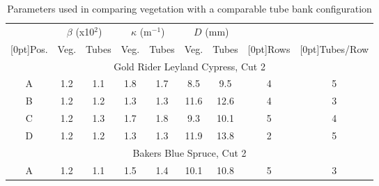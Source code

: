 \documentclass[12pt]{article}
\begin{document}
\begin{table}[!]
    \centering
    \caption{Parameters used in comparing vegetation with a comparable tube bank configuration}
    \label{tab:tube_parameters}
    \begin{tabular}{|c|c|c|c|c|c|c|c|c|}
    \hline
                                 & \multicolumn{2}{|c|}{$\beta$ (x10$^{2}$)} & \multicolumn{2}{|c|}{$\kappa$ (m$^{-1}$)} & \multicolumn{2}{|c|}{$D$ (mm)} &                             &                                  \\ \cline{2-7}
    \raisebox{1.5ex}[0pt]{Pos.}  & Veg.             & Tubes      & Veg.                 & Tubes              & Veg.              & Tubes      & \raisebox{1.5ex}[0pt]{Rows} & \raisebox{1.5ex}[0pt]{Tubes/Row} \\ \hline \hline
    \multicolumn{9}{|c|}{Gold Rider Leyland Cypress, Cut 2}                                                                                                                                                    \\ \hline
    A                            & 1.2            & 1.1      & 1.8                  & 1.7                & 8.5               & 9.5        & 4                           & 5                                \\ \hline
    B                            & 1.2            &1.2      & 1.3                  & 1.3                & 11.6              & 12.6       & 4                           & 3                                \\ \hline
    C                            & 1.2            & 1.3      & 1.7                  & 1.8                & 9.3               & 10.1       & 5                           & 4                                \\ \hline
    D                            & 1.2           & 1.2      & 1.3                  & 1.3                & 11.9              & 13.8       & 2                           & 5                                \\ \hline
        \multicolumn{9}{|c|}{Bakers Blue Spruce, Cut 2}                                                                                                                                                    \\ \hline
    A                            &1.2           & 1.1      & 1.5                  & 1.4                & 10.1              & 10.8       & 5                           & 3                                \\ \hline

\end{tabular}
\end{table}
\end{document}
